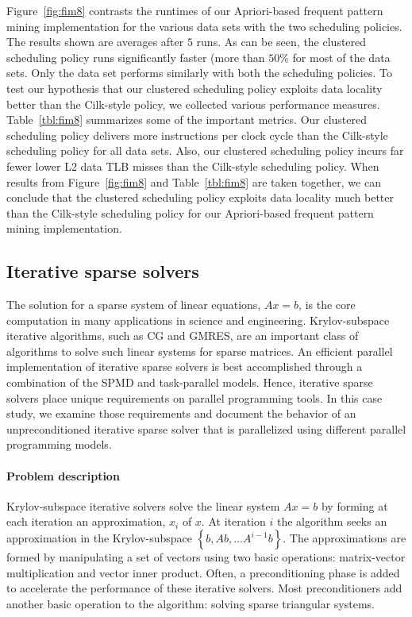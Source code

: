 \documentclass{sig-alternate}
\begin{document}
Figure~\ref{fig:fim8} contrasts the runtimes of our Apriori-based frequent
pattern mining implementation for the various data sets with the two scheduling
policies. The results shown are averages after $5$ runs. As can be seen, the
clustered scheduling policy runs significantly faster (more than $50\%$ for
most of the data sets. Only the  data set performs
similarly with both the scheduling policies. To test our hypothesis that our
clustered scheduling policy exploits data locality better than the Cilk-style
policy, we collected various performance measures. Table~\ref{tbl:fim8}
summarizes some of the important metrics. Our clustered scheduling policy
delivers more instructions per clock cycle than the Cilk-style scheduling
policy for all data sets. Also, our clustered scheduling policy incurs far
fewer lower L2 data TLB misses than the Cilk-style scheduling policy. When
results from Figure~\ref{fig:fim8} and Table~\ref{tbl:fim8} are taken together,
we can conclude that the clustered scheduling policy exploits data locality
much better than the Cilk-style scheduling policy for our Apriori-based
frequent pattern mining implementation.

\subsection{Iterative sparse solvers}
\label{sec:cg}
The solution for a sparse system of linear equations, $Ax=b$, is the core
computation in many applications in science and engineering. Krylov-subspace
iterative algorithms, such as CG and GMRES, are an important class of
algorithms to solve such linear systems for sparse matrices.  An efficient
parallel implementation of iterative sparse solvers is best accomplished
through a combination of the SPMD and task-parallel models. Hence,
iterative sparse solvers place unique requirements on parallel programming
tools.  In this case study, we examine those requirements and document the
behavior of an unpreconditioned iterative sparse solver that is parallelized
using different parallel programming models.

\paragraph{Problem description}
Krylov-subspace iterative solvers solve the linear system $Ax=b$ by forming at
each iteration an approximation, $x_i$ of $x$. At iteration $i$ the algorithm
seeks an approximation in the Krylov-subspace $\left\{ b,Ab,\dots
A^{i-1}b\right\} $.  The approximations are formed by manipulating a set of
vectors using two basic operations: matrix-vector multiplication and vector
inner product. Often, a preconditioning phase is added to accelerate the
performance of these iterative solvers. Most preconditioners add another basic
operation to the algorithm: solving sparse triangular systems. 
\end{document}
